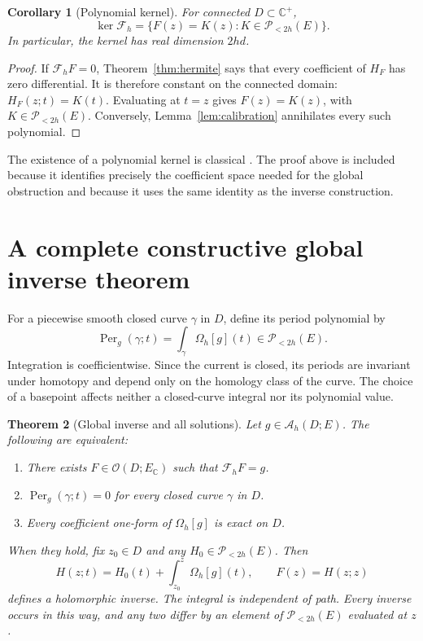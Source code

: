 \documentclass[11pt,a4paper]{article}
\numberwithin{equation}{section}
\newtheorem{theorem}{Theorem}[section]
\newtheorem{corollary}[theorem]{Corollary}
\theoremstyle{definition}
\theoremstyle{remark}
\newcommand{\C}{\mathbb C}
\newcommand{\Hol}{\mathcal O}
\newcommand{\AM}{\mathcal A_h}
\newcommand{\Fu}{\mathcal F_h}
\newcommand{\PP}{\mathscr P_{<2h}(E)}
\newcommand{\Om}{\Omega_h}
\newcommand{\Per}{\operatorname{Per}}
\begin{document}
\begin{corollary}[Polynomial kernel]\label{cor:kernel}
For connected $D\subset\C^+$,
\begin{equation}\label{eq:kernel}
 \ker\Fu=\{F(z)=K(z):K\in\PP\}.
\end{equation}
In particular, the kernel has real dimension $2hd$.
\end{corollary}

\begin{proof}
If $\Fu F=0$, Theorem~\ref{thm:hermite} says that every coefficient of
$H_F$ has zero differential. It is therefore constant on the connected domain:
$H_F(z;t)=K(t)$. Evaluating at $t=z$ gives $F(z)=K(z)$, with $K\in\PP$.
Conversely, Lemma~\ref{lem:calibration} annihilates every such polynomial.
\end{proof}

The existence of a polynomial kernel is classical
\cite{colombo2014,demartino2023}. The proof above is included because it identifies
precisely the coefficient space needed for the global obstruction and because
it uses the same identity as the inverse construction.

\section{A complete constructive global inverse theorem}
\label{sec:inverse}

For a piecewise smooth closed curve $\gamma$ in $D$, define its period
polynomial by
\begin{equation}\label{eq:period}
 \Per_g(\gamma;t)=\int_\gamma\Om[g](t)\in\PP.
\end{equation}
Integration is coefficientwise. Since the current is closed, its periods
are invariant under homotopy and depend only on the homology class of the
curve. The choice of a basepoint affects neither a closed-curve integral nor
its polynomial value.

\begin{theorem}[Global inverse and all solutions]\label{thm:inverse}
Let $g\in\AM(D;E)$. The following are equivalent:
\begin{enumerate}[label=\textup{(\alph*)},leftmargin=2em]
\item There exists $F\in\Hol(D;E_{\C})$ such that $\Fu F=g$.
\item $\Per_g(\gamma;t)=0$ for every closed curve $\gamma$ in $D$.
\item Every coefficient one-form of $\Om[g]$ is exact on $D$.
\end{enumerate}
When they hold, fix $z_0\in D$ and any $H_0\in\PP$. Then
\begin{equation}\label{eq:inverse-formula}
 H(z;t)=H_0(t)+\int_{z_0}^{z}\Om[g](t),\qquad F(z)=H(z;z)
\end{equation}
defines a holomorphic inverse. The integral is independent of path. Every
inverse occurs in this way, and any two differ by an element of $\PP$
evaluated at $z$.
\end{theorem}
\end{document}
